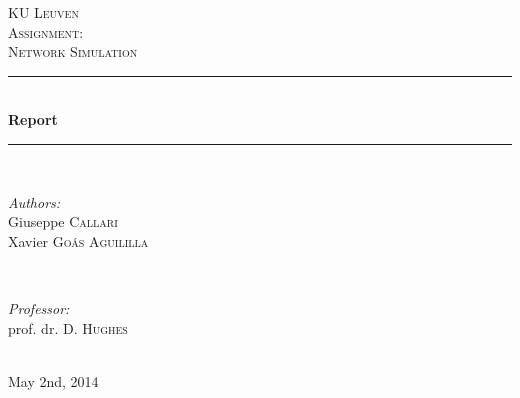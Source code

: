 \begin{titlepage}
\thispagestyle{empty}
\newcommand{\HRule}{\rule{\linewidth}{0.5mm}}
\center
\textsc{\LARGE KU Leuven}\\[1.5cm]
\textsc{\Large Assignment:}\\[0.5cm]
\textsc{\large Network Simulation}\\[0.5cm]

\HRule \\[0.4cm]
{ \Huge \bfseries Report}\\[0.4cm]
\HRule \\[1.5cm]

\begin{minipage}{0.4\textwidth}
\begin{flushleft} \large
\emph{Authors:}\\
Giuseppe \textsc{Callari}\\
Xavier \textsc{Go\'as Aguililla}
\end{flushleft}
\end{minipage}
~
\begin{minipage}{0.4\textwidth}
\begin{flushright} \large
\emph{Professor:} \\
prof. dr. D. \textsc{Hughes}
\end{flushright}
\end{minipage}\\[4cm]

{\large May 2nd, 2014}\\[3cm]
\vfill

\end{titlepage}
